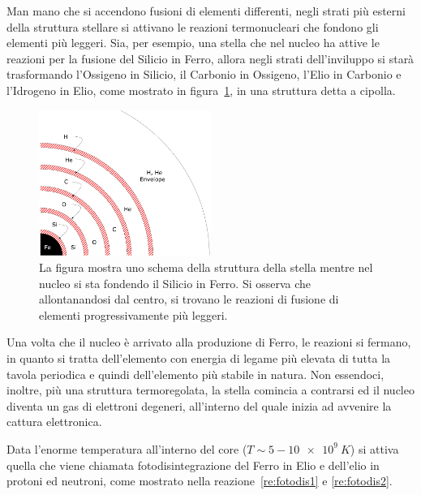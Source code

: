 Man mano che si accendono fusioni di elementi differenti, negli strati più esterni della struttura stellare si attivano le reazioni termonucleari che fondono gli elementi più leggeri. Sia, per esempio, una stella che nel nucleo ha attive le reazioni per la fusione del Silicio in Ferro, allora negli strati dell'inviluppo si starà trasformando l'Ossigeno in Silicio, il Carbonio in Ossigeno, l'Elio in Carbonio e l'Idrogeno in Elio, come mostrato in figura~\ref{fig:onion}, in una struttura detta a cipolla.

\begin{figure}
    \centering
    \includegraphics[width = 0.5\textwidth]{immagini/onion.png}
    \caption{La figura mostra uno schema della struttura della stella mentre nel nucleo si sta fondendo il Silicio in Ferro. Si osserva che allontanandosi dal centro, si trovano le reazioni di fusione di elementi progressivamente più leggeri.}\label{fig:onion}
\end{figure}

Una volta che il nucleo è arrivato alla produzione di Ferro, le reazioni si fermano, in quanto si tratta dell'elemento con energia di legame più elevata di tutta la tavola periodica e quindi dell'elemento più stabile in natura. Non essendoci, inoltre, più una struttura termoregolata, la stella comincia a contrarsi ed il nucleo diventa un gas di elettroni degeneri, all'interno del quale inizia ad avvenire la cattura elettronica. 


Data l'enorme temperatura all'interno del core ($T \sim 5-\SI{10e9}{K}$) si attiva quella che viene chiamata fotodisintegrazione del Ferro in Elio e dell'elio in protoni ed neutroni, come mostrato nella reazione~\ref{re:fotodis1} e  \ref{re:fotodis2}.


